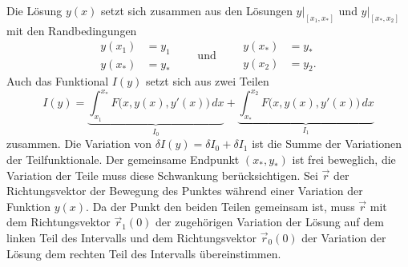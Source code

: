 Die Lösung $y(x)$ setzt sich zusammen aus den Lösungen $y|_{[x_1,x_*]}$
und $y|_{[x_*,x_2]}$ mit den Randbedingungen
\begin{equation*}
\begin{aligned}
y(x_1)&=y_1\\
y(x_*)&=y_*
\end{aligned}
\qquad\text{und}\qquad
\begin{aligned}
y(x_*)&=y_*\\
y(x_2)&=y_2.
\end{aligned}
\end{equation*}
Auch das Funktional $I(y)$ setzt sich aus zwei Teilen
\[
I(y)
=
\underbrace{
\int_{x_1}^{x_*}
F\bigl(x,y(x),y'(x)\bigr)
\,dx
}_{\displaystyle I_0}
+
\underbrace{
\int_{x_*}^{x_2}
F\bigl(x,y(x),y'(x)\bigr)
\,dx
}_{\displaystyle I_1}
\]
zusammen.
Die Variation von $\delta I(y)=\delta I_0+\delta I_1$ ist die Summe 
der Variationen der Teilfunktionale.
Der gemeinsame Endpunkt $(x_*,y_*)$ ist frei beweglich,
die Variation der Teile muss diese Schwankung berücksichtigen.
Sei $\vec{r}$ der Richtungsvektor der Bewegung des Punktes während
einer Variation der Funktion $y(x)$.
Da der Punkt den beiden Teilen gemeinsam ist, muss $\vec{r}$
mit dem Richtungsvektor $\vec{r}_1(0)$ der zugehörigen Variation
der Lösung auf dem linken Teil des Intervalls und dem
Richtungsvektor $\vec{r}_0(0)$ der Variation der Lösung dem rechten Teil
des Intervalls übereinstimmen.

